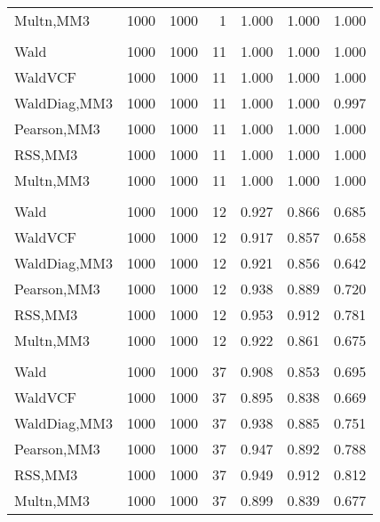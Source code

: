 \documentclass[
]{article}
\begin{document}
\begin{table}[H]
{\begin{tabular}[t]{lrrrrrr}
\hspace{1em}Multn,MM3 & 1000 & 1000 & 1 & 1.000 & 1.000 & 1.000\\
\addlinespace[0.3em]
\multicolumn{7}{l}{\textbf{1F 15V}}\\
\hspace{1em}Wald & 1000 & 1000 & 11 & 1.000 & 1.000 & 1.000\\
\hspace{1em}WaldVCF & 1000 & 1000 & 11 & 1.000 & 1.000 & 1.000\\
\hspace{1em}WaldDiag,MM3 & 1000 & 1000 & 11 & 1.000 & 1.000 & 0.997\\
\hspace{1em}Pearson,MM3 & 1000 & 1000 & 11 & 1.000 & 1.000 & 1.000\\
\hspace{1em}RSS,MM3 & 1000 & 1000 & 11 & 1.000 & 1.000 & 1.000\\
\hspace{1em}Multn,MM3 & 1000 & 1000 & 11 & 1.000 & 1.000 & 1.000\\
\addlinespace[0.3em]
\multicolumn{7}{l}{\textbf{2F 10V}}\\
\hspace{1em}Wald & 1000 & 1000 & 12 & 0.927 & 0.866 & 0.685\\
\hspace{1em}WaldVCF & 1000 & 1000 & 12 & 0.917 & 0.857 & 0.658\\
\hspace{1em}WaldDiag,MM3 & 1000 & 1000 & 12 & 0.921 & 0.856 & 0.642\\
\hspace{1em}Pearson,MM3 & 1000 & 1000 & 12 & 0.938 & 0.889 & 0.720\\
\hspace{1em}RSS,MM3 & 1000 & 1000 & 12 & 0.953 & 0.912 & 0.781\\
\hspace{1em}Multn,MM3 & 1000 & 1000 & 12 & 0.922 & 0.861 & 0.675\\
\addlinespace[0.3em]
\multicolumn{7}{l}{\textbf{3F 15V}}\\
\hspace{1em}Wald & 1000 & 1000 & 37 & 0.908 & 0.853 & 0.695\\
\hspace{1em}WaldVCF & 1000 & 1000 & 37 & 0.895 & 0.838 & 0.669\\
\hspace{1em}WaldDiag,MM3 & 1000 & 1000 & 37 & 0.938 & 0.885 & 0.751\\
\hspace{1em}Pearson,MM3 & 1000 & 1000 & 37 & 0.947 & 0.892 & 0.788\\
\hspace{1em}RSS,MM3 & 1000 & 1000 & 37 & 0.949 & 0.912 & 0.812\\
\hspace{1em}Multn,MM3 & 1000 & 1000 & 37 & 0.899 & 0.839 & 0.677\\
\bottomrule
\end{tabular}}
\endgroup{}
\end{table}
\end{document}
